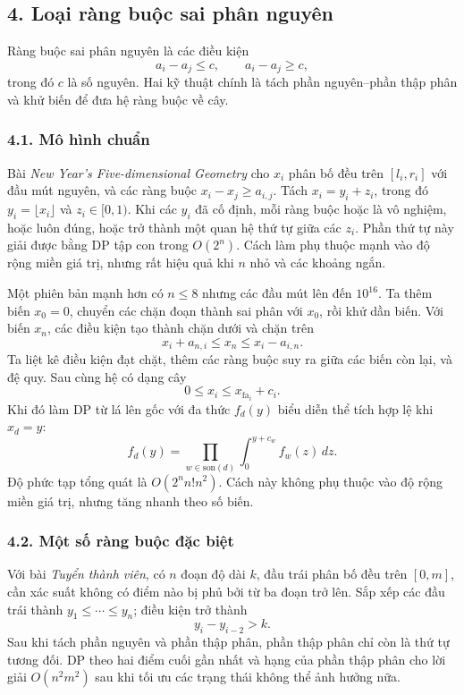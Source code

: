 \documentclass[11pt]{article}
\begin{document}
\subsection*{4. Loại ràng buộc sai phân nguyên}

Ràng buộc sai phân nguyên là các điều kiện
\[
  a_i-a_j\le c,\qquad a_i-a_j\ge c,
\]
trong đó \(c\) là số nguyên. Hai kỹ thuật chính là tách phần nguyên--phần thập
phân và khử biến để đưa hệ ràng buộc về cây.

\subsubsection*{4.1. Mô hình chuẩn}

Bài \emph{New Year's Five-dimensional Geometry} cho \(x_i\) phân bố đều trên
\([l_i,r_i]\) với đầu mút nguyên, và các ràng buộc \(x_i-x_j\ge a_{i,j}\).
Tách \(x_i=y_i+z_i\), trong đó \(y_i=\lfloor x_i\rfloor\) và \(z_i\in[0,1)\).
Khi các \(y_i\) đã cố định, mỗi ràng buộc hoặc là vô nghiệm, hoặc luôn đúng,
hoặc trở thành một quan hệ thứ tự giữa các \(z_i\). Phần thứ tự này giải được
bằng DP tập con trong \(O(2^n)\). Cách làm phụ thuộc mạnh vào độ rộng miền giá
trị, nhưng rất hiệu quả khi \(n\) nhỏ và các khoảng ngắn.

Một phiên bản mạnh hơn có \(n\le 8\) nhưng các đầu mút lên đến \(10^{16}\). Ta
thêm biến \(x_0=0\), chuyển các chặn đoạn thành sai phân với \(x_0\), rồi khử
dần biến. Với biến \(x_n\), các điều kiện tạo thành chặn dưới và chặn trên
\[
  x_i+a_{n,i}\le x_n\le x_i-a_{i,n}.
\]
Ta liệt kê điều kiện đạt chặt, thêm các ràng buộc suy ra giữa các biến còn lại,
và đệ quy. Sau cùng hệ có dạng cây
\[
  0\le x_i\le x_{\mathrm{fa}_i}+c_i.
\]
Khi đó làm DP từ lá lên gốc với đa thức \(f_d(y)\) biểu diễn thể tích hợp lệ
khi \(x_d=y\):
\[
  f_d(y)=\prod_{w\in \mathrm{son}(d)}
  \int_{0}^{y+c_w} f_w(z)\,dz.
\]
Độ phức tạp tổng quát là \(O(2^n n! n^2)\). Cách này không phụ thuộc vào độ rộng
miền giá trị, nhưng tăng nhanh theo số biến.

\subsubsection*{4.2. Một số ràng buộc đặc biệt}

Với bài \emph{Tuyển thành viên}, có \(n\) đoạn độ dài \(k\), đầu trái phân bố
đều trên \([0,m]\), cần xác suất không có điểm nào bị phủ bởi từ ba đoạn trở
lên. Sắp xếp các đầu trái thành \(y_1\le\cdots\le y_n\); điều kiện trở thành
\[
  y_i-y_{i-2}>k.
\]
Sau khi tách phần nguyên và phần thập phân, phần thập phân chỉ còn là thứ tự
tương đối. DP theo hai điểm cuối gần nhất và hạng của phần thập phân cho lời
giải \(O(n^2m^2)\) sau khi tối ưu các trạng thái không thể ảnh hưởng nữa.
\end{document}
